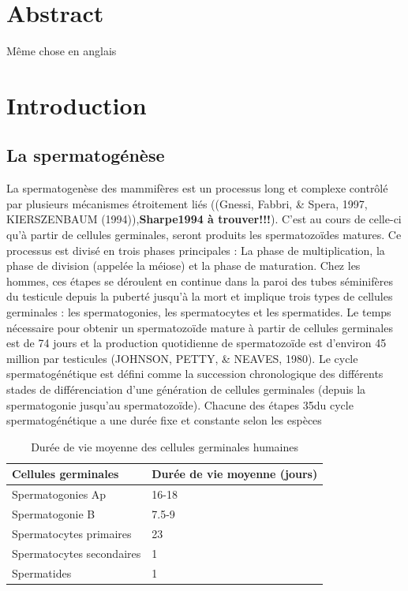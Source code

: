 \documentclass[12pt,twoside]{reedthesis}
\theoremstyle{definition}
\theoremstyle{definition}
\theoremstyle{remark}
\begin{document}
  \chapter*{Abstract}\label{abstract}
  
  Même chose en anglais
  
  \chapter{Introduction}\label{introInf}
  
  \section{La spermatogénèse}\label{la-spermatogenese}
  
  La spermatogenèse des mammifères est un processus long et complexe
  contrôlé par plusieurs mécanismes étroitement liés ((Gnessi, Fabbri, \&
  Spera, 1997, KIERSZENBAUM (1994)),\textbf{Sharpe1994 à trouver!!!}).
  C'est au cours de celle-ci qu'à partir de cellules germinales, seront
  produits les spermatozoïdes matures. Ce processus est divisé en trois
  phases principales : La phase de multiplication, la phase de division
  (appelée la méiose) et la phase de maturation. Chez les hommes, ces
  étapes se déroulent en continue dans la paroi des tubes séminifères du
  testicule depuis la puberté jusqu'à la mort et implique trois types de
  cellules germinales : les spermatogonies, les spermatocytes et les
  spermatides. Le temps nécessaire pour obtenir un spermatozoïde mature à
  partir de cellules germinales est de 74 jours et la production
  quotidienne de spermatozoïde est d'environ 45 million par testicules
  (JOHNSON, PETTY, \& NEAVES, 1980). Le cycle spermatogénétique est défini
  comme la succession chronologique des différents stades de
  différenciation d'une génération de cellules germinales (depuis la
  spermatogonie jusqu'au spermatozoïde). Chacune des étapes 35du cycle
  spermatogénétique a une durée fixe et constante selon les espèces
  
  \begin{table}
  
  \caption{\label{tab:unnamed-chunk-1}Durée de vie moyenne des cellules germinales humaines}
  \centering
  \begin{tabular}[t]{l|l}
  \hline
  Cellules germinales & Durée de vie moyenne (jours)\\
  \hline
  Spermatogonies Ap & 16-18\\
  \hline
  Spermatogonie B & 7.5-9\\
  \hline
  Spermatocytes primaires & 23\\
  \hline
  Spermatocytes secondaires & 1\\
  \hline
  Spermatides & 1\\
  \hline
  \end{tabular}
  \end{table}
  
\end{document}
